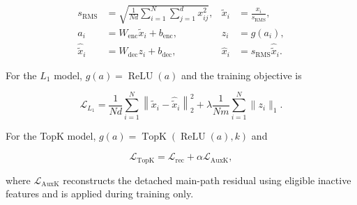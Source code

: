 \begin{align}
    s_{\mathrm{RMS}}
    &= \sqrt{\frac{1}{Nd}\sum_{i=1}^{N}\sum_{j=1}^{d}x_{ij}^{2}},
    & \tilde{x}_i &= \frac{x_i}{s_{\mathrm{RMS}}}, \\
    a_i
    &= W_{\mathrm{enc}}\tilde{x}_i+b_{\mathrm{enc}},
    & z_i &= g(a_i), \\
    \hat{\tilde{x}}_i
    &= W_{\mathrm{dec}}z_i+b_{\mathrm{dec}},
    & \hat{x}_i &= s_{\mathrm{RMS}}\hat{\tilde{x}}_i .
\end{align}

For the $L_1$ model, $g(a)=\operatorname{ReLU}(a)$ and the training objective is

\begin{equation}
    \mathcal{L}_{L_1}
    = \frac{1}{Nd}\sum_{i=1}^{N}
      \left\lVert\tilde{x}_i-\hat{\tilde{x}}_i\right\rVert_2^2
      + \lambda\frac{1}{Nm}\sum_{i=1}^{N}\lVert z_i\rVert_1 .
\end{equation}

For the TopK model, $g(a)=\operatorname{TopK}(\operatorname{ReLU}(a),k)$ and

\begin{equation}
    \mathcal{L}_{\mathrm{TopK}}
    = \mathcal{L}_{\mathrm{rec}} + \alpha\mathcal{L}_{\mathrm{AuxK}},
\end{equation}

where $\mathcal{L}_{\mathrm{AuxK}}$ reconstructs the detached main-path residual
using eligible inactive features and is applied during training only.
